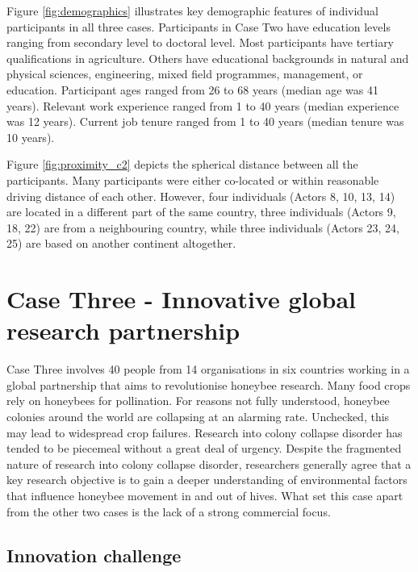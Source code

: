 Figure \ref{fig:demographics} illustrates key demographic features of individual participants in all three cases. Participants in Case Two have education levels ranging from secondary level to doctoral level. Most participants have tertiary qualifications in agriculture. Others have educational backgrounds in natural and physical sciences, engineering, mixed field programmes, management, or education. Participant ages ranged from 26 to 68 years (median age was 41 years). Relevant work experience ranged from 1 to 40 years (median experience was 12 years). Current job tenure ranged from 1 to 40 years (median tenure was 10 years). \medskip

Figure \ref{fig:proximity_c2} depicts the spherical distance between all the participants. Many participants were either co-located or within reasonable driving distance of each other. However, four individuals (Actors 8, 10, 13, 14) are located in a different part of the same country, three individuals (Actors 9, 18, 22) are from a neighbouring country, while three individuals (Actors 23, 24, 25) are based on another continent altogether. \medskip

\section{Case Three - Innovative global research partnership}

Case Three involves 40 people from 14 organisations in six countries working in a global partnership that aims to revolutionise honeybee research. Many food crops rely on honeybees for pollination. For reasons not fully understood, honeybee colonies around the world are collapsing at an alarming rate. Unchecked, this may lead to widespread crop failures. Research into colony collapse disorder has tended to be piecemeal without a great deal of urgency. Despite the fragmented nature of research into colony collapse disorder, researchers generally agree that a key research objective is to gain a deeper understanding of environmental factors that influence honeybee movement in and out of hives. What set this case apart from the other two cases is the lack of a strong commercial focus. \medskip

\subsection{Innovation challenge}

